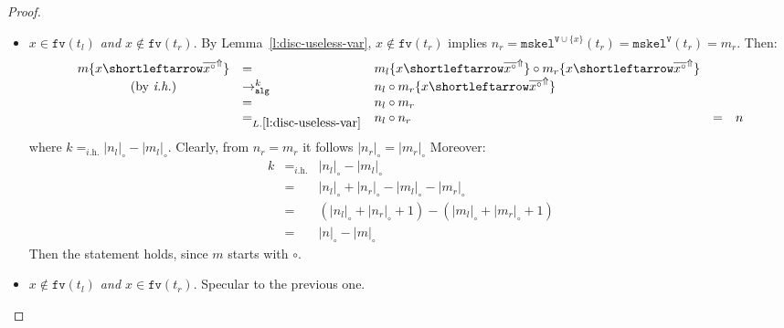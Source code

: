 \documentclass[10pt,a4paper]{article}
\theoremstyle{remark}
\newcommand{\tm}{t}
\newcommand{\var}{x}
\newcommand{\Rew}[1]{\rightarrow_{#1}}
\newcommand{\symfont}[1]{\mathtt{#1}}
\newcommand{\isub}[2]{\{#1{\shortleftarrow}#2\}}
\newcommand{\ih}{{\textit{i.h.}}\xspace}
\newcommand{\fv}[1]{\symfont{fv}(#1)}
\newcommand{\reflemma}[1]{Lemma~\ref{l:#1}}
\newcommand{\reflemmaeq}[1]{{L.\ref{l:#1}}}
\newcommand{\sizep}[2]{|#1|_{#2}}
\newcommand{\taken}{\circ}
\newcommand{\frontiersym}{\Uparrow}
\newcommand{\skelu}[1]{\overline{#1}^{\frontiersym}}
\newcommand{\appt}{\taken}
\newcommand{\tomark}{\Rew{\symfont{alg}}}
\newcommand{\mtm}{m}
\newcommand{\mtmtwo}{n}
\newcommand{\disc}[2]{\symfont{disc}^{#2}(#1)}
\renewcommand{\disc}[2]{\symfont{mskel}^{#2}(#1)}
\newcommand{\skelvars}{\theta}
\renewcommand{\skelvars}{\symfont{V}}
\newcommand{\sizet}[1]{\sizep{#1}{\taken}}
\begin{document}
\begin{proof}
\begin{itemize}
\begin{itemize}
\begin{itemize}
\item \emph{$\var \in \fv{\tm_l}$ and $\var\notin\fv{\tm_r}$}. By \reflemma{disc-useless-var}, $\var \notin \fv{\tm_r}$ implies $\mtmtwo_r=\disc{\tm_r}{\skelvars \cup \{\var\}} = \disc{\tm_r}{\skelvars} = \mtm_r$.
Then:
\[\begin{array}{cllllll}
\mtm\isub\var{\skelu{\var^\taken}}
  &= & 
  \mtm_l\isub\var{\skelu{\var^\taken}}\appt\mtm_r\isub\var{\skelu{\var^\taken}} 
  \\
   \mbox{(by \ih)}  &\tomark^{k} &
\mtmtwo_l\appt \mtm_r\isub\var{\skelu{\var^\taken}} 
  \\
 &= &
  \mtmtwo_l \appt \mtm_r
  \\
 &=_{\reflemmaeq{disc-useless-var}} &
  \mtmtwo_l \appt \mtmtwo_r
  &=&
  \mtmtwo
\end{array}\]
where $k =_{\ih} \sizet{\mtmtwo_l} - \sizet{\mtm_l}$. Clearly, from $\mtmtwo_r= \mtm_r$ it follows $\sizet{\mtmtwo_r}= \sizet{\mtm_r}$
Moreover:
\[\begin{array}{lllllll}
k & =_{\ih} & 
\sizet{\mtmtwo_l} - \sizet{\mtm_l} 
\\
& = & 
\sizet{\mtmtwo_l} +\sizet{\mtmtwo_r} - \sizet{\mtm_l} - \sizet{\mtm_r}
\\
& = & 
(\sizet{\mtmtwo_l} +\sizet{\mtmtwo_r}+1) - (\sizet{\mtm_l} + \sizet{\mtm_r}+1)
\\
& = & 
\sizet{\mtmtwo} - \sizet{\mtm}
\end{array}\]
Then the statement holds, since $\mtm$ starts with $\taken$.


\item \emph{$\var \notin \fv{\tm_l}$ and $\var\in\fv{\tm_r}$}. Specular to the previous one.
\end{itemize}



\end{itemize}
\end{itemize}
\end{proof}
\end{document}
